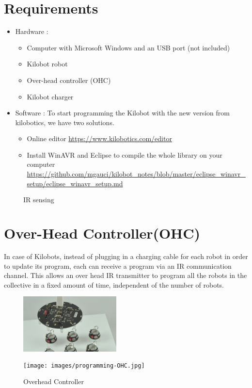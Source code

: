 \documentclass{report}[12pt]
\begin{document}
\section{Requirements}
\begin{itemize}
    \item Hardware :
    \begin{itemize}
        \item Computer with Microsoft Windows and an USB port (not included)
        \item Kilobot robot 
        \item Over-head controller (OHC) 
        \item Kilobot charger 
    \end{itemize}
    \item Software : To start programming the Kilobot with the new version from kilobotics, we have two solutions. 
    \begin{itemize}
        \item Online editor \url{https://www.kilobotics.com/editor}
        \item  Install WinAVR and Eclipse to compile the whole library on your computer
        \url{https://github.com/mgauci/kilobot\_notes/blob/master/eclipse\_winavr\_setup/eclipse\_winavr\_setup.md}
    \end{itemize}
\end{itemize}

\begin{figure}[H]
	\centering
	\caption{IR sensing}
	\label{fig:IR sensing}
\end{figure}


\section{Over-Head Controller(OHC)}
In case of Kilobots, instead of plugging in a charging cable for each robot in order to update its program, each can receive a program via an IR communication channel. This allows an over head IR transmitter to program all the robots in the collective in a fixed amount of time, independent of the number of robots.

\begin{figure}[H]
\centering
	\begin{minipage}{.4\textwidth}
	\centering
	\includegraphics[width=2.0in]{images/OHC.jpg}
	\end{minipage}
	\begin{minipage}{.4\textwidth}
	\centering
	\texttt{[image: images/programming-OHC.jpg]}
	\end{minipage}
\caption{Overhead Controller}
\label{fig:Overhead Controller}
\end{figure}
\end{document}
